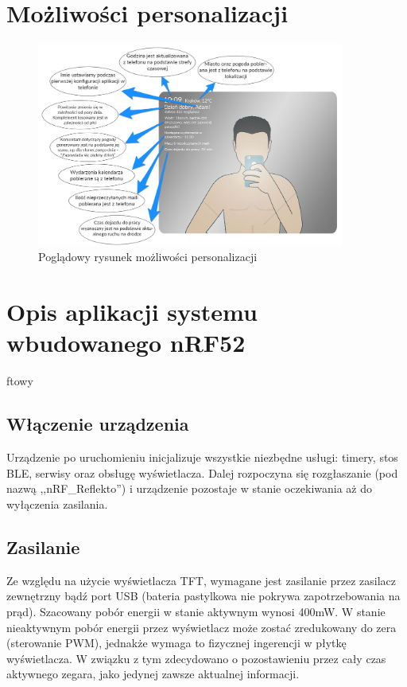 \documentclass[a4paper,11pt]{article}
\begin{document}
\section{Możliwości personalizacji}
\begin{figure}[H]
	\includegraphics[width=0.9\textwidth,center]{dymki_kreski.png}
	\caption {Poglądowy rysunek możliwości personalizacji}
	\label{lustro_konf}
\end{figure}

\section{Opis aplikacji systemu wbudowanego nRF52}
ftowy
\subsection{Włączenie urządzenia}
Urządzenie po uruchomieniu inicjalizuje wszystkie niezbędne usługi: timery, stos BLE, serwisy oraz obsługę wyświetlacza. Dalej rozpoczyna się rozgłaszanie (pod nazwą ,,nRF\_Reflekto'') i urządzenie pozostaje w stanie oczekiwania aż do wyłączenia zasilania. 

\subsection{Zasilanie}
Ze względu na użycie wyświetlacza TFT, wymagane jest zasilanie przez zasilacz zewnętrzny bądź port USB (bateria pastylkowa nie pokrywa zapotrzebowania na prąd). Szacowany pobór energii w stanie aktywnym wynosi 400mW. W stanie nieaktywnym pobór energii przez wyświetlacz może zostać zredukowany do zera (sterowanie PWM), jednakże wymaga to fizycznej ingerencji w płytkę wyświetlacza. W związku z tym zdecydowano o pozostawieniu przez cały czas aktywnego zegara, jako jedynej zawsze aktualnej informacji.
\end{document}
